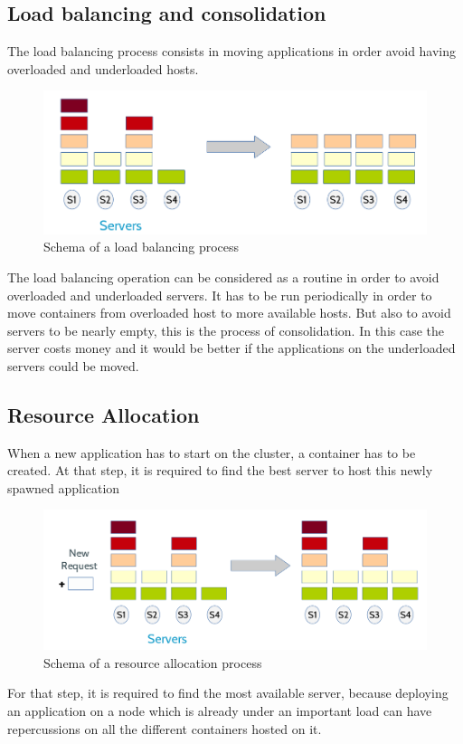 \subsection{Load balancing and consolidation}

The load balancing process consists in moving applications in order avoid having
overloaded and underloaded hosts.

\begin{figure}[h!]
	\includegraphics[width=\textwidth]{./Images/loadbalancing.png}
	\caption{Schema of a load balancing process}
\end{figure}

The load balancing operation can be considered as a routine in order to avoid
overloaded and underloaded servers. It has to be run periodically in order to
move containers from overloaded host to more available hosts. But also to avoid
servers to be nearly empty, this is the process of consolidation. In this case
the server costs money and it would be better if the applications on the
underloaded servers could be moved.

\subsection{Resource Allocation}

When a new application has to start on the cluster, a container has to be
created.  At that step, it is required to find the best server to host this
newly spawned application

\begin{figure}[h!]
	\includegraphics[width=\textwidth]{./Images/resourceallocation.png}
	\caption{Schema of a resource allocation process}
\end{figure}

For that step, it is required to find the most available server, because
deploying an application on a node which is already under an important load can
have repercussions on all the different containers hosted on it.
